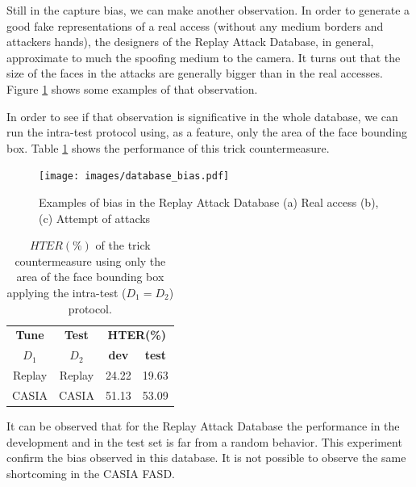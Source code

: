 Still in the capture bias, we can make another observation. In order to generate a good fake representations of a real access (without any medium borders and attackers hands), the designers of the Replay Attack Database, in general, approximate to much the spoofing medium to the camera. It turns out that the size of the faces in the attacks are generally bigger than in the real accesses. Figure \ref{fig:database_bias} shows some examples of that observation. 

In order to see if that observation is significative in the whole database, we can run the intra-test protocol using, as a feature, only the area of the face bounding box. Table \ref{tb:TrickCounter} shows the performance of this trick countermeasure.

\begin{figure}[!btb]
\begin{center}
\texttt{[image: images/database\_bias.pdf]}
\caption[Examples of bias in the Replay Attack Database]{Examples of bias in the Replay Attack Database (a) Real access (b),(c) Attempt of attacks} 
\label{fig:database_bias}
\end{center}
\end{figure}


\begin{table}[ht!]
\caption{$HTER(\%)$ of the trick countermeasure using only the area of the face bounding box  applying the intra-test ($D_1 = D_2$) protocol.}
\begin{center}
  \begin{tabular}{ | c | c | c  c | }
    \hline

    \textbf{Tune} & \textbf{Test} & \multicolumn{2}{c|}{\textbf{HTER(\%)}} \\ 
     $D_1$ & $D_2$ & \textbf{dev} & \textbf{test}  \\ \hline
    
     Replay & Replay & 24.22 & 19.63  \\ 
     CASIA  & CASIA & 51.13 & 53.09  \\
    \hline
  \end{tabular}
\end{center}
\label{tb:TrickCounter}
\end{table}

It can be observed that for the Replay Attack Database the performance in the development and in the test set is far from a random behavior. This experiment confirm the bias observed in this database. It is not possible to observe the same shortcoming in the CASIA FASD. 


